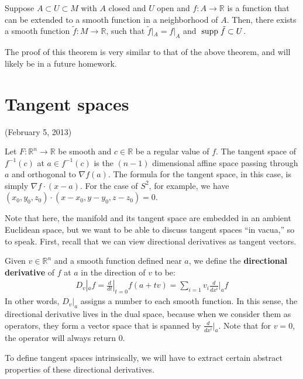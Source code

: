 \documentclass{../mathnotes}
\begin{document}
\begin{thm}
    Suppose $A\subset U\subset M$ with $A$ closed and $U$ open and $f:A\to \mathbb{R}$ is a function that can be extended to a smooth function in a neighborhood of $A$.
    Then, there exists a smooth function $\tilde{f}:M\to\mathbb{R}$, such that $\tilde{f}|_A=f|_A$ and $\;\textnormal{supp}\;\tilde{f}\subset U$.
\end{thm}
The proof of this theorem is very similar to that of the above theorem, and will likely be in a future homework.


\section{Tangent spaces}

(February 5, 2013)

\begin{exmp}
    Let $F:\mathbb{R}^n\to \mathbb{R}$ be smooth and $c\in\mathbb{R}$ be a regular value of $f$. The tangent space of $f^{-1}(c)$ at $a\in f^{-1}(c)$
    is the $(n-1)$ dimensional affine space passing through $a$ and orthogonal to $\nabla f(a)$. The formula for the tangent space, in this case,
    is simply $\nabla f\cdot (x-a)$. For the case of $S^2$, for example, we have $(x_0,y_0,z_0)\cdot(x-x_0,y-y_0,z-z_0)=0$.
\end{exmp}

Note that here, the manifold and its tangent space are embedded in an ambient Euclidean space, but we want to be able to discuss tangent spaces ``in vacua,''
so to speak. First, recall that we can view directional derivatives as tangent vectors.

\begin{defn}
    Given $v\in\mathbb{R}^n$ and a smooth function defined near $a$, we define the \textbf{directional derivative} of $f$ at $a$ in the direction of $v$ to be:
    \begin{align*}
        D_v|_a f=\frac{d}{dt}|_{t=0}f(a+tv)=\sum_{i=1}v_i\frac{d}{dx^i}|_a f
    \end{align*}
    In other words, $D_v|_a$ assigns a number to each smooth function. In this sense, the directional derivative lives in the dual space, because when we
    consider them as operators, they form a vector space that is spanned by $\frac{d}{dx^i}|_a$. Note that for $v=0$, the operator will always return 0. 
\end{defn}

To define tangent spaces intrinsically, we will have to extract certain abstract properties of these directional derivatives.
\end{document}
